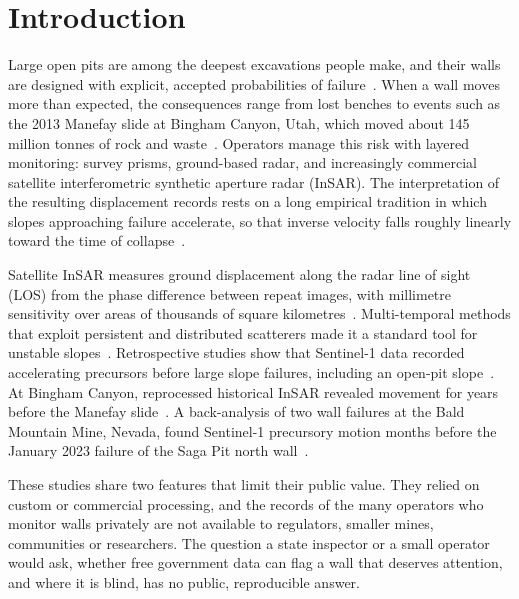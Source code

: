 \documentclass[aps,prd,twocolumn,superscriptaddress,nofootinbib,floatfix,preprintnumbers,10pt]{revtex4-2}
\begin{document}
\maketitle

\section{Introduction}

Large open pits are among the deepest excavations people make, and their walls are designed with explicit, accepted probabilities of failure~\cite{ReadStacey2009}. When a wall moves more than expected, the consequences range from lost benches to events such as the 2013 Manefay slide at Bingham Canyon, Utah, which moved about 145 million tonnes of rock and waste~\cite{Pankow2014,Gaida2019}. Operators manage this risk with layered monitoring: survey prisms, ground-based radar, and increasingly commercial satellite interferometric synthetic aperture radar (InSAR). The interpretation of the resulting displacement records rests on a long empirical tradition in which slopes approaching failure accelerate, so that inverse velocity falls roughly linearly toward the time of collapse~\cite{Fukuzono1985,Voight1988,Dick2015,Carla2017}.

Satellite InSAR measures ground displacement along the radar line of sight (LOS) from the phase difference between repeat images, with millimetre sensitivity over areas of thousands of square kilometres~\cite{Massonnet1998,Rosen2000,Hanssen2001}. Multi-temporal methods that exploit persistent and distributed scatterers made it a standard tool for unstable slopes~\cite{Ferretti2001,Berardino2002,Colesanti2006,Wasowski2014}. Retrospective studies show that Sentinel-1 data recorded accelerating precursors before large slope failures, including an open-pit slope~\cite{Carla2019,Intrieri2018}. At Bingham Canyon, reprocessed historical InSAR revealed movement for years before the Manefay slide~\cite{Gaida2019}. A back-analysis of two wall failures at the Bald Mountain Mine, Nevada, found Sentinel-1 precursory motion months before the January 2023 failure of the Saga Pit north wall~\cite{Bourgeois2024}.

These studies share two features that limit their public value. They relied on custom or commercial processing, and the records of the many operators who monitor walls privately are not available to regulators, smaller mines, communities or researchers. The question a state inspector or a small operator would ask, whether free government data can flag a wall that deserves attention, and where it is blind, has no public, reproducible answer.
\end{document}
